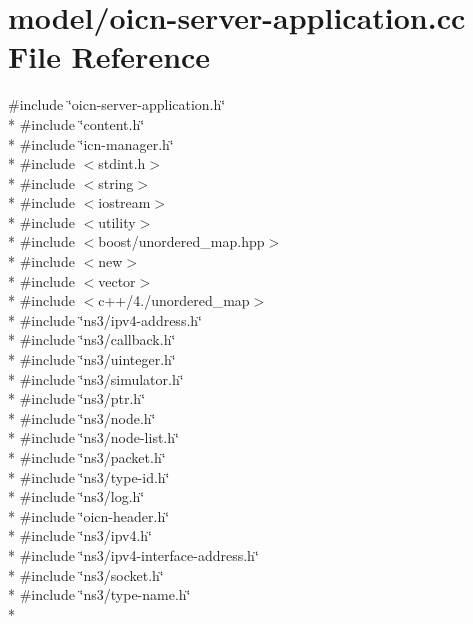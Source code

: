 \hypertarget{oicn-server-application_8cc}{\section{model/oicn-\/server-\/application.cc File Reference}
\label{oicn-server-application_8cc}
}
{\ttfamily \#include \char`\"{}oicn-\/server-\/application.\-h\char`\"{}}\\*
{\ttfamily \#include \char`\"{}content.\-h\char`\"{}}\\*
{\ttfamily \#include \char`\"{}icn-\/manager.\-h\char`\"{}}\\*
{\ttfamily \#include $<$stdint.\-h$>$}\\*
{\ttfamily \#include $<$string$>$}\\*
{\ttfamily \#include $<$iostream$>$}\\*
{\ttfamily \#include $<$utility$>$}\\*
{\ttfamily \#include $<$boost/unordered\-\_\-map.\-hpp$>$}\\*
{\ttfamily \#include $<$new$>$}\\*
{\ttfamily \#include $<$vector$>$}\\*
{\ttfamily \#include $<$c++/4./unordered\-\_\-map$>$}\\*
{\ttfamily \#include \char`\"{}ns3/ipv4-\/address.\-h\char`\"{}}\\*
{\ttfamily \#include \char`\"{}ns3/callback.\-h\char`\"{}}\\*
{\ttfamily \#include \char`\"{}ns3/uinteger.\-h\char`\"{}}\\*
{\ttfamily \#include \char`\"{}ns3/simulator.\-h\char`\"{}}\\*
{\ttfamily \#include \char`\"{}ns3/ptr.\-h\char`\"{}}\\*
{\ttfamily \#include \char`\"{}ns3/node.\-h\char`\"{}}\\*
{\ttfamily \#include \char`\"{}ns3/node-\/list.\-h\char`\"{}}\\*
{\ttfamily \#include \char`\"{}ns3/packet.\-h\char`\"{}}\\*
{\ttfamily \#include \char`\"{}ns3/type-\/id.\-h\char`\"{}}\\*
{\ttfamily \#include \char`\"{}ns3/log.\-h\char`\"{}}\\*
{\ttfamily \#include \char`\"{}oicn-\/header.\-h\char`\"{}}\\*
{\ttfamily \#include \char`\"{}ns3/ipv4.\-h\char`\"{}}\\*
{\ttfamily \#include \char`\"{}ns3/ipv4-\/interface-\/address.\-h\char`\"{}}\\*
{\ttfamily \#include \char`\"{}ns3/socket.\-h\char`\"{}}\\*
{\ttfamily \#include \char`\"{}ns3/type-\/name.\-h\char`\"{}}\\*
